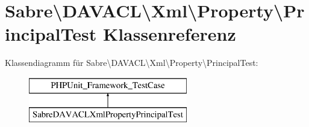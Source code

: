 \hypertarget{class_sabre_1_1_d_a_v_a_c_l_1_1_xml_1_1_property_1_1_principal_test}{}\section{Sabre\textbackslash{}D\+A\+V\+A\+CL\textbackslash{}Xml\textbackslash{}Property\textbackslash{}Principal\+Test Klassenreferenz}
\label{class_sabre_1_1_d_a_v_a_c_l_1_1_xml_1_1_property_1_1_principal_test}
Klassendiagramm für Sabre\textbackslash{}D\+A\+V\+A\+CL\textbackslash{}Xml\textbackslash{}Property\textbackslash{}Principal\+Test\+:\begin{figure}[H]
\begin{center}
\leavevmode
\includegraphics[height=2.000000cm]{class_sabre_1_1_d_a_v_a_c_l_1_1_xml_1_1_property_1_1_principal_test}
\end{center}
\end{figure}
